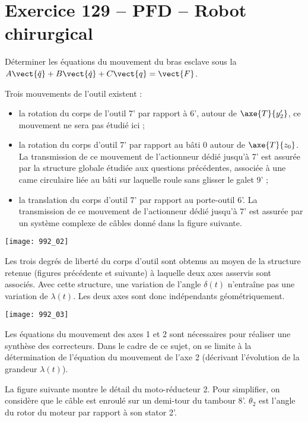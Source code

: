 \section*{Exercice 129 -- PFD -- Robot chirurgical}
\setcounter{exo}{0}

\begin{obj}
Déterminer les équations du mouvement du bras esclave sous la 
$A\vect{\ddot{q}}+B\vect{\dot{q}}+C\vect{q}=\vect{F}$.
\end{obj}


Trois mouvements de l’outil existent :
\begin{itemize}
\item la rotation du corps de l’outil 7’ par rapport à 6’, autour de $\axe{T}{y_2'}$, ce mouvement ne sera pas étudié ici ;
\item la rotation du corps d’outil 7’ par rapport au bâti 0 autour de $\axe{T}{z_0}$. La transmission de ce mouvement de
l’actionneur dédié jusqu’à 7’ est assurée par la structure globale étudiée aux questions précédentes, associée
à une came circulaire liée au bâti sur laquelle roule sans glisser le galet 9’ ;
\item la translation du corps d’outil 7’ par rapport au porte-outil 6’. La transmission de ce mouvement de l’actionneur
dédié jusqu’à 7’ est assurée par un système complexe de câbles donné dans la figure suivante.
\end{itemize}


\begin{center}
\texttt{[image: 992\_02]}
\end{center}

Les trois degrés de liberté du corps d’outil sont obtenus au moyen de la structure retenue (figures précédente et suivante) à
laquelle deux axes asservis sont associés. Avec cette structure, une variation de l’angle $\delta(t)$ n’entraîne pas une
variation de $\lambda(t)$. Les deux axes sont donc indépendants géométriquement.


\begin{center}
\texttt{[image: 992\_03]}
\end{center}

Les équations du mouvement des axes 1 et 2 sont nécessaires pour réaliser une synthèse
des correcteurs. Dans le cadre de ce sujet, on se limite à la détermination de l’équation du mouvement de l’axe
2 (décrivant l’évolution de la grandeur $\lambda(t)$).

La figure suivante montre le détail du moto-réducteur 2. Pour simplifier, on considère que le câble est enroulé sur un
demi-tour du tambour 8’. $\theta_2$ est l’angle du rotor du moteur par rapport à son stator 2’.



